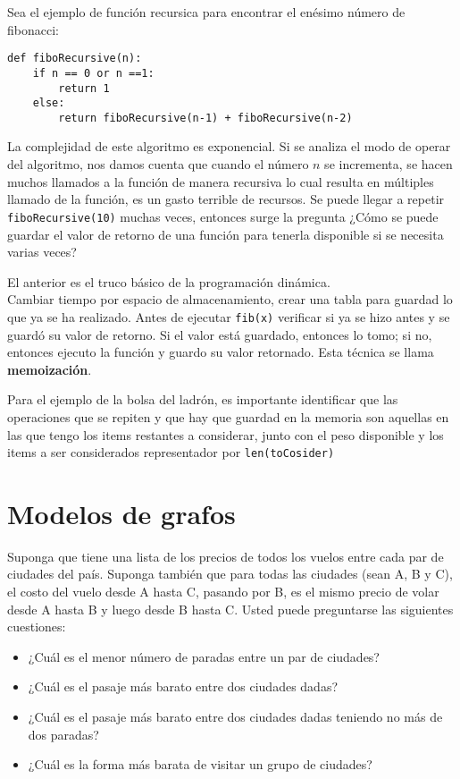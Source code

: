 Sea el ejemplo de función recursica para encontrar el enésimo número de fibonacci:

\begin{verbatim}
def fiboRecursive(n):
    if n == 0 or n ==1:
        return 1
    else:
        return fiboRecursive(n-1) + fiboRecursive(n-2)
\end{verbatim}

La complejidad de este algoritmo es exponencial. Si se analiza el modo de operar del algoritmo, nos damos cuenta que cuando el número $n$ se incrementa, se hacen muchos llamados a la función de manera recursiva lo cual resulta en múltiples llamado de la función, es un gasto terrible de recursos. Se puede llegar a repetir \texttt{fiboRecursive(10)} muchas veces, entonces surge la pregunta ¿Cómo se puede guardar el valor de retorno de una función para tenerla disponible si se necesita varias veces?

El anterior es el truco básico de la programación dinámica.\\

Cambiar tiempo por espacio de almacenamiento, crear una tabla para guardad lo que ya se ha realizado. Antes de ejecutar \texttt{fib(x)} verificar si ya se hizo antes y se guardó su valor de retorno. Si el valor está guardado, entonces lo tomo; si no, entonces ejecuto la función y guardo su valor retornado. Esta técnica se llama \textbf{memoización}.


Para el ejemplo de la bolsa del ladrón, es importante identificar que las operaciones que se repiten y que hay que guardad en la memoria son aquellas en las que tengo los items restantes a considerar, junto con el peso disponible y los items a ser considerados representador por \texttt{len(toCosider)}


\section{Modelos de grafos}

Suponga que tiene una lista de los precios de todos los vuelos entre cada par de ciudades del país. Suponga también que para todas las ciudades (sean A, B y C), el costo del vuelo desde A hasta C, pasando por B, es el mismo precio de volar desde A hasta B y luego desde B hasta C. Usted puede preguntarse las siguientes cuestiones:

\begin{itemize}
    \item ¿Cuál es el menor número de paradas entre un par de ciudades?
    \item ¿Cuál es el pasaje más barato entre dos ciudades dadas?
    \item ¿Cuál es el pasaje más barato entre dos ciudades dadas teniendo no más de dos paradas?
    \item ¿Cuál es la forma más barata de visitar un grupo de ciudades?
\end{itemize}

